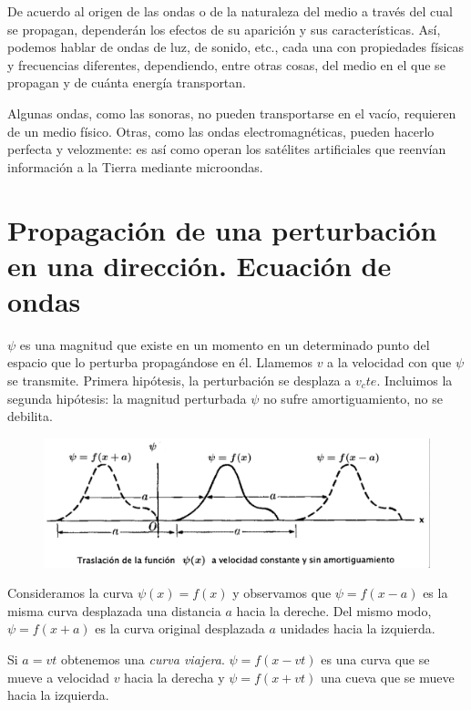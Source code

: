 \begin{miparrafo}
De acuerdo al origen de las ondas o de la naturaleza del medio a través del cual se propagan, dependerán los efectos de su aparición y sus características. Así, podemos hablar de ondas de luz, de sonido, etc., cada una con propiedades físicas y frecuencias diferentes, dependiendo, entre otras cosas, del medio en el que se propagan y de cuánta energía transportan.

Algunas ondas, como las sonoras, no pueden transportarse en el vacío, requieren de un medio físico. Otras, como las ondas electromagnéticas, pueden hacerlo perfecta y velozmente: es así como operan los satélites artificiales que reenvían información a la Tierra mediante microondas.
\end{miparrafo}

\section[Propagación de una perturbación en una dirección. Ecuación de ondas]{Propagación de una perturbación en una dirección. Ecuación de ondas}

$\psi$ es una magnitud que existe en un momento en un determinado punto del espacio que lo perturba propagándose en él. Llamemos $v$ a la velocidad con que $\psi$ se transmite. Primera hipótesis, la perturbación  se desplaza a $v_cte$. Incluimos la segunda hipótesis: la magnitud perturbada $\psi$ no sufre amortiguamiento, no se debilita.

 \begin{figure}[H]
		\centering
		\includegraphics[width=1\textwidth]{imagenes/imagenes21/T21IM02.png}
	\end{figure}
	
Consideramos la curva $\psi(x)=f(x)$ y observamos que $\psi=f(x-a)$ es la misma curva desplazada una distancia $a$ hacia la dereche. Del mismo modo, $\psi=f(x+a)$ es la curva original desplazada $a$ unidades hacia la izquierda.

Si $a=vt$ obtenemos una \emph{curva viajera}. $\psi=f(x-vt)$ es una curva que se mueve a velocidad $v$ hacia la derecha y $\psi=f(x+vt)$ una cueva que se mueve hacia la izquierda.

